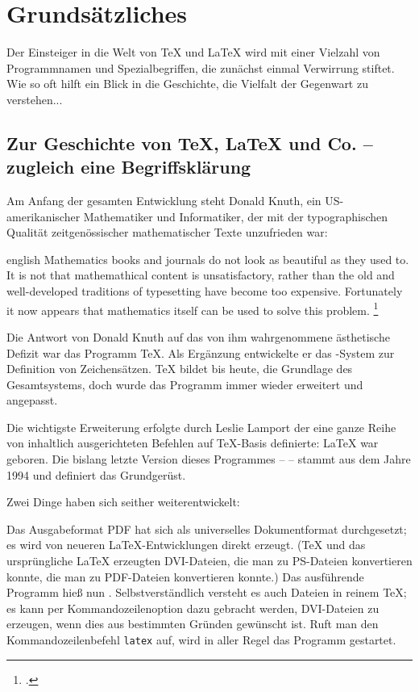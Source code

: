 \chapter{Grundsätzliches}

Der Einsteiger in die Welt von \TeX{} und \LaTeX{} wird mit einer Vielzahl von Programmnamen und 
Spezialbegriffen, die zunächst einmal Verwirrung stiftet. 
Wie so oft hilft ein Blick in die Geschichte, die Vielfalt der Gegenwart zu verstehen...


\section{Zur Geschichte von \TeX{}, \LaTeX{} und Co. -- zugleich eine Begriffsklärung}

Am Anfang der gesamten Entwicklung steht Donald Knuth, ein US-amerikanischer Mathematiker und 
Informatiker, der mit der typographischen Qualität zeitgenössischer mathematischer Texte 
unzufrieden war:

\begin{foreigndisplayquote}{english}
 Mathematics books and journals do not look as beautiful as they used to.
 It is not that mathemathical content is unsatisfactory, rather than the old and 
 well-developed traditions of typesetting have become too expensive.
 Fortunately it now appears that mathematics itself can be used to solve this problem.%
 \footcite[Zitiert nach:][1]{voss:einfuehrung}
\end{foreigndisplayquote}

Die Antwort von Donald Knuth auf das von ihm wahrgenommene ästhetische Defizit war das  
Programm \TeX. Als Ergänzung entwickelte er das \METAFONT-System zur Definition von 
Zeichensätzen.
\TeX{} bildet bis heute, die Grundlage des Gesamtsystems, doch wurde das Programm immer 
wieder erweitert und angepasst.

Die wichtigste Erweiterung erfolgte durch Leslie Lamport der eine ganze Reihe von 
inhaltlich ausgerichteten Befehlen auf \TeX-Basis definierte: \LaTeX{} war geboren.
Die bislang letzte Version dieses Programmes -- \LaTeXe{} -- stammt aus dem Jahre 1994
und definiert das Grundgerüst.

Zwei Dinge haben sich seither weiterentwickelt:

Das Ausgabeformat PDF hat sich als universelles Dokumentformat durchgesetzt; es wird von neueren
\LaTeX-Entwicklungen direkt erzeugt. (\TeX{} und das ursprüngliche \LaTeX{} erzeugten DVI-Dateien,
die man zu PS-Dateien konvertieren konnte, die man zu PDF-Dateien konvertieren konnte.)
Das ausführende Programm hieß nun \pdfLaTeX. 
Selbstverständlich versteht es auch Dateien in reinem \TeX ;
es kann per Kommandozeilenoption dazu gebracht werden, DVI-Dateien zu erzeugen, wenn dies aus 
bestimmten Gründen gewünscht ist.
Ruft man den Kommandozeilenbefehl \lstinline/latex/ auf, wird in aller Regel das Programm 
\pdfLaTeX{} gestartet.

